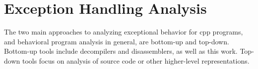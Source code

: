 \begin{comment}
  \subsection{Automata Learning}\label{related-automata}
  Automata learning algorithms are a different approach to state machine extraction.
  They perform black-box testing in order to \emph{learn} the behavior of a system \autocite{steffen2011active}.
  For example, \textcite{fiter2017ssh} used automata learning to infer the functionality of three \gls{ssh} server implementations.
  Their learning methodology was based on LearnLib \autocite{raffelt2005learnlib}, an automata learning library.
  Automata learning typically produces abstract high-level models concerning the in/output relations at the protocol level.
  Their \emph{mapper}, which maps back and forth from abstract inputs/outputs to concrete packages to be sent to/received from the server,
  was based on the Paramiko \autocite{paramiko} \gls{ssh} client implementation.

  \Textcite{kerkers2017assessing} performed security analysis
  of power distribution \glspl{ics} using automata learning.
  LearnLib was again used to provide the necessary learning features.
  In addition to implementing a mapper to support the necessary \gls{ics}
  protocols, Kerkers also had to provide software and hardware testing interfaces for the physical \glspl{ics} that were under test.

  Automata learning techniques can be used to infer state machines when source code is not available.
  However, they do not provide formal statements of overapproximation.
  They also require development of a \emph{mapper}, which translates between the learner and the black box.
  Developing such a mapper is a significant per-binary manual effort.
  Its implementation has a severe impact on the validity of the inferred state machine.
  In contrast, our disassembly approach does not require such manual effort.
\end{comment}

\section{Exception Handling Analysis}\label{related-exceptions}
The two main approaches to analyzing exceptional behavior for \gls{cpp} programs, and behavioral program analysis in general, are bottom-up and top-down.
Bottom-up tools include decompilers and disassemblers, as well as this work.
Top-down tools focus on analysis of source code or other higher-level representations.

